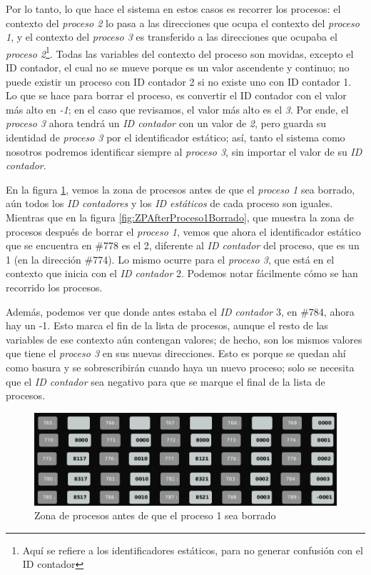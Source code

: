 \documentclass[letterpaper,12pt,oneside]{book}
\begin{document}
		Por lo tanto, lo que hace el sistema
		en estos casos
		es recorrer los procesos: el contexto del  \textit{proceso 2} lo pasa a las direcciones que ocupa 
		el contexto del \textit{proceso 1}, y el contexto del \textit{proceso 3} es transferido a 
		las direcciones que ocupaba el \textit{proceso 2}\footnote{Aquí se refiere
		a los identificadores estáticos, para no generar confusión con el ID contador}.
		Todas las variables del contexto del proceso son movidas, excepto el ID contador, 
		el
		cual no se mueve porque es un valor ascendente y continuo; no puede existir un proceso con ID contador 2 si no existe uno
		con ID contador 1. 
		Lo que se hace para borrar el proceso, es convertir el ID contador con el valor más 
		alto en \textit{-1}; en el caso que revisamos, el valor más alto es el \textit{3}. 
		Por ende, el \textit{proceso 3} ahora tendrá un \textit{ID contador} con un valor de \textit{2}, pero guarda
		su identidad de \textit{proceso 3} 
		por el identificador estático; así, tanto el sistema como nosotros podremos identificar siempre al \textit{proceso 3}, 
		sin importar el valor de su \textit{ID contador}.
		

		En la figura \ref{fig:ZPBeforeProceso1Terminado}, vemos la zona de procesos antes de que el \textit{proceso 1} sea borrado, aún todos los 
		\textit{ID contadores} y los \textit{ID estáticos } de cada proceso
		son iguales. Mientras que en la figura \ref{fig:ZPAfterProceso1Borrado}, que muestra
		la zona de procesos después de borrar el \textit{proceso 1}, vemos que ahora el identificador estático que se encuentra en
		\#778 es el 2, diferente al \textit{ID contador} del proceso, que es un 1 (en la dirección \#774). Lo mismo ocurre para el \textit{proceso 3},
		que está en el contexto que inicia con el \textit{ID contador} 2. Podemos notar fácilmente cómo se han recorrido los procesos.		
		
		Además, podemos ver que donde antes estaba el \textit{ID contador} 3, en 
		\#784, ahora
		hay un -1. Esto marca el fin de la lista de procesos, aunque el resto de las variables de  ese contexto aún contengan valores;
		 de hecho, son los mismos valores
		que tiene el \textit{proceso 3} en sus nuevas direcciones. Esto es porque se quedan ahí como basura y se sobrescribirán cuando haya un nuevo 
		proceso; solo se necesita
		que el \textit{ID contador} sea negativo para que se marque el final de la lista de procesos.
		
		\begin{figure}[h]		
			\centering
			\includegraphics[scale=0.45]{media/CARDIACC/ZPBeforeProceso1Terminado.png}
			\caption{ Zona de procesos antes de que el proceso 1 sea borrado }
			\label{fig:ZPBeforeProceso1Terminado}
		\end{figure}
		
\end{document}
